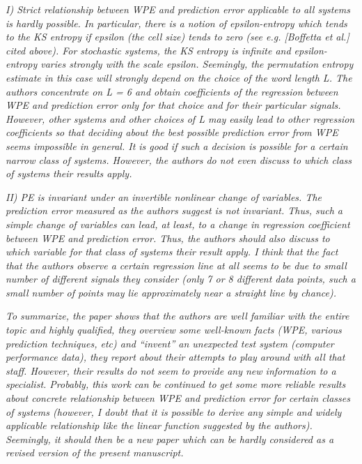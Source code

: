 \documentclass[12pt]{article}
\begin{document}
\emph{I) Strict relationship between WPE and prediction error applicable to all
systems is hardly possible. In particular, there is a notion of epsilon-entropy
which tends to the KS entropy if epsilon (the cell size) tends to zero (see e.g.
[Boffetta et al.] cited above). For stochastic systems, the KS entropy is
infinite and epsilon-entropy varies strongly with the scale epsilon. Seemingly,
the permutation entropy estimate in this case will strongly depend on the choice
of the word length L. The authors concentrate on L = 6 and obtain coefficients
of the regression between WPE and prediction error only for that choice and for
their particular signals. However, other systems and other choices of L may
easily lead to other regression coefficients so that deciding about the best
possible prediction error from WPE seems impossible in general. It is good if
such a decision is possible for a certain narrow class of systems. However, the
authors do not even discuss to which class of systems their results apply.}

\emph{II) PE is invariant under an invertible nonlinear change of variables. The
prediction error measured as the authors suggest is not invariant. Thus, such a
simple change of variables can lead, at least, to a change in regression
coefficient between WPE and prediction error. Thus, the authors should also
discuss to which variable for that class of systems their result apply. I think
that the fact that the authors observe a certain regression line at all seems to
be due to small number of different signals they consider (only 7 or 8 different
data points, such a small number of points may lie approximately near a straight
line by chance).}

\emph{To summarize, the paper shows that the authors are well familiar with the
entire topic and highly qualified, they overview some well-known facts (WPE,
various prediction techniques, etc) and ``invent'' an unexpected test system
(computer performance data), they report about their attempts to play around
with all that staff. However, their results do not seem to provide any new
information to a specialist. Probably, this work can be continued to get some
more reliable results about concrete relationship between WPE and prediction
error for certain classes of systems (however, I doubt that it is possible to
derive any simple and widely applicable relationship like the linear function
suggested by the authors). Seemingly, it should then be a new paper which can be
hardly considered as a revised version of the present manuscript.}
\end{document}
